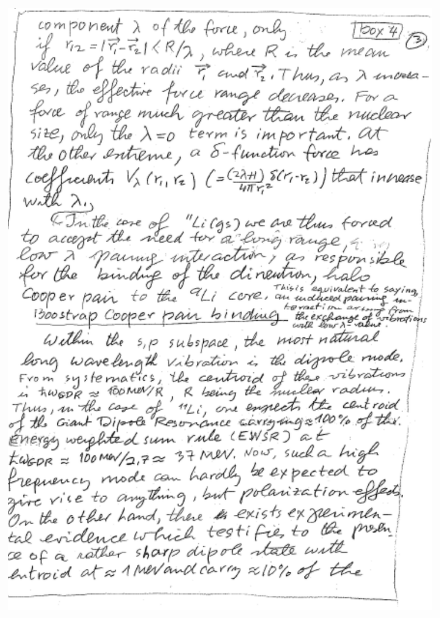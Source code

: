 \documentclass[a4paper,11pt]{book}
\numberwithin{equation}{section}
\numberwithin{figure}{section}
\numberwithin{table}{section}
\begin{document}
\begin{figure}
\centerline{\includegraphics*[width=\textwidth,angle=0]{figs/box4_4.pdf}}
\end{figure}
\end{document}
